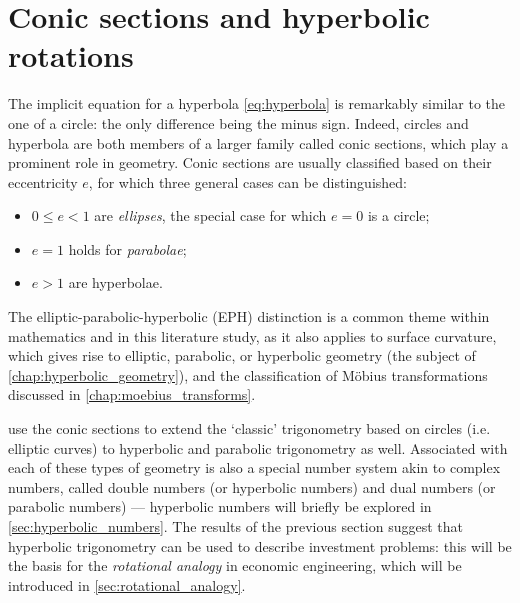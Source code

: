 \section{Conic sections and hyperbolic rotations}
The implicit equation for a hyperbola \cref{eq:hyperbola} is remarkably similar to the one of a circle: the only difference being the minus sign. Indeed, circles and hyperbola are both members of a larger family called conic sections, which play a prominent role in geometry. Conic sections are usually classified based on their eccentricity $e$, for which three general cases can be distinguished:
\begin{itemize}
    \item $0 \leq e < 1$ are \emph{ellipses}, the special case for which $e = 0$ is a circle;
    \item $e = 1$ holds for \emph{parabolae};
    \item $e > 1$ are hyperbolae.
\end{itemize}
The elliptic-parabolic-hyperbolic (EPH) distinction is a common theme within mathematics and in this literature study, as it also applies to surface curvature, which gives rise to elliptic, parabolic, or hyperbolic geometry (the subject of \cref{chap:hyperbolic_geometry}), and the classification of Möbius transformations discussed in \cref{chap:moebius_transforms}.

\citet{Harkin2004} use the conic sections to extend the `classic' trigonometry based on circles (i.e. elliptic curves) to hyperbolic and parabolic trigonometry as well. Associated with each of these types of geometry is also a special number system akin to complex numbers, called double numbers (or hyperbolic numbers) and dual numbers (or parabolic numbers) --- hyperbolic numbers will briefly be explored in \cref{sec:hyperbolic_numbers}. The results of the previous section suggest that hyperbolic trigonometry can be used to describe investment problems: this will be the basis for the \emph{rotational analogy} in economic engineering, which will be introduced in \cref{sec:rotational_analogy}.

